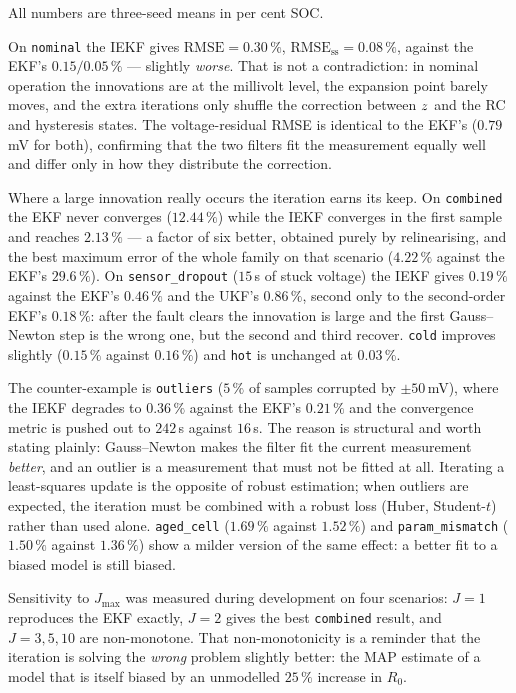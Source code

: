 All numbers are three-seed means in per cent SOC.

On \texttt{nominal} the IEKF gives $\text{RMSE} = 0.30\,\%$, $\text{RMSE}_{\text{ss}} =
0.08\,\%$, against the EKF's $0.15/0.05\,\%$ --- slightly \emph{worse}. That is not a
contradiction: in nominal operation the innovations are at the millivolt level, the expansion
point barely moves, and the extra iterations only shuffle the correction between $z$ and the
RC and hysteresis states. The voltage-residual RMSE is identical to the EKF's
($0.79$\,mV for both), confirming that the two filters fit the measurement equally well and
differ only in how they distribute the correction.

Where a large innovation really occurs the iteration earns its keep. On \texttt{combined} the
EKF never converges ($12.44\,\%$) while the IEKF converges in the first sample and reaches
$2.13\,\%$ --- a factor of six better, obtained purely by relinearising, and the best maximum
error of the whole family on that scenario ($4.22\,\%$ against the EKF's $29.6\,\%$). On
\texttt{sensor\_dropout} ($15$\,s of stuck voltage) the IEKF gives $0.19\,\%$ against the EKF's
$0.46\,\%$ and the UKF's $0.86\,\%$, second only to the second-order EKF's $0.18\,\%$: after
the fault clears the
innovation is large and the first Gauss--Newton step is the wrong one, but the second and third
recover. \texttt{cold} improves slightly ($0.15\,\%$ against $0.16\,\%$) and \texttt{hot} is
unchanged at $0.03\,\%$.

The counter-example is \texttt{outliers} ($5\,\%$ of samples corrupted by $\pm 50$\,mV), where
the IEKF degrades to $0.36\,\%$ against the EKF's $0.21\,\%$ and the convergence metric is
pushed out to $242$\,s against $16$\,s. The reason is structural and worth stating plainly:
Gauss--Newton makes the filter fit the current measurement \emph{better}, and an outlier is a
measurement that must not be fitted at all. Iterating a least-squares update is the opposite of
robust estimation; when outliers are expected, the iteration must be combined with a robust
loss (Huber, Student-$t$) rather than used alone. \texttt{aged\_cell} ($1.69\,\%$ against
$1.52\,\%$) and \texttt{param\_mismatch} ($1.50\,\%$ against $1.36\,\%$) show a milder version
of the same effect: a better fit to a biased model is still biased.

Sensitivity to $J_{\max}$ was measured during development on four scenarios: $J = 1$ reproduces
the EKF exactly, $J = 2$ gives the best \texttt{combined} result, and $J = 3, 5, 10$ are
non-monotone. That non-monotonicity is a reminder that the iteration is solving the
\emph{wrong} problem slightly better: the MAP estimate of a model that is itself biased by an
unmodelled $25\,\%$ increase in $R_0$.

